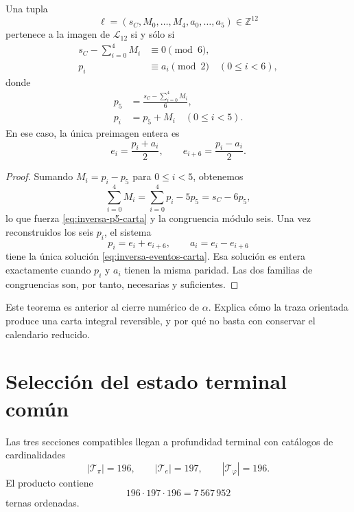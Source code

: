 \begin{theorem}
\label{thm:inversion-carta-integral-156}
Una tupla
\[
 \ell=(s_C,M_0,\ldots,M_4,a_0,\ldots,a_5)\in\mathbb Z^{12}
\]
pertenece a la imagen de \(\mathcal L_{12}\) si y sólo si
\begin{align}
 s_C-\sum_{i=0}^{4}M_i&\equiv0\pmod6,
 \label{eq:congruencia-seis-carta}\\
 p_i&\equiv a_i\pmod2
 \quad(0\leq i<6),
 \label{eq:congruencia-paridad-carta}
\end{align}
donde
\begin{align}
 p_5&=\frac{s_C-\sum_{i=0}^{4}M_i}{6},
 \label{eq:inversa-p5-carta}\\
 p_i&=p_5+M_i\quad(0\leq i<5).
 \label{eq:inversa-pi-carta}
\end{align}
En ese caso, la única preimagen entera es
\begin{equation}
 e_i=\frac{p_i+a_i}{2},
 \qquad
 e_{i+6}=\frac{p_i-a_i}{2}.
 \label{eq:inversa-eventos-carta}
\end{equation}
\end{theorem}

\begin{proof}
Sumando \(M_i=p_i-p_5\) para \(0\leq i<5\), obtenemos
\[
 \sum_{i=0}^{4}M_i
 =\sum_{i=0}^{4}p_i-5p_5
 =s_C-6p_5,
\]
lo que fuerza \eqref{eq:inversa-p5-carta} y la congruencia módulo seis.
Una vez reconstruidos los seis \(p_i\), el sistema
\[
 p_i=e_i+e_{i+6},
 \qquad a_i=e_i-e_{i+6}
\]
tiene la única solución \eqref{eq:inversa-eventos-carta}. Esa solución es
entera exactamente cuando \(p_i\) y \(a_i\) tienen la misma paridad.
Las dos familias de congruencias son, por tanto, necesarias y suficientes.
\end{proof}

Este teorema es anterior al cierre numérico de \(\alpha\). Explica cómo la
traza orientada produce una carta integral reversible, y por qué no basta
con conservar el calendario reducido.

\section{Selección del estado terminal común}

Las tres secciones compatibles llegan a profundidad terminal con catálogos
de cardinalidades
\[
 |\mathcal T_\pi|=196,
 \qquad
 |\mathcal T_e|=197,
 \qquad
 |\mathcal T_\varphi|=196.
\]
El producto contiene
\begin{equation}
 196\cdot197\cdot196=7\,567\,952
 \label{eq:cardinal-producto-terminal}
\end{equation}
ternas ordenadas.

